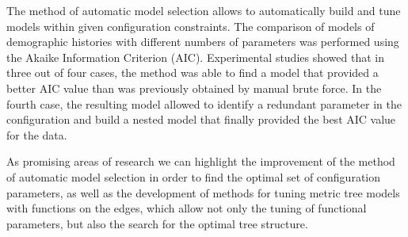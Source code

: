 The method of automatic model selection allows to automatically build and tune models within given configuration constraints.
The comparison of models of demographic histories with different numbers of parameters was performed using the Akaike Information Criterion (AIC).
Experimental studies showed that in three out of four cases, the method was able to find a model that provided a better AIC value than was previously obtained by manual brute force.
In the fourth case, the resulting model allowed to identify a redundant parameter in the configuration and build a nested model that finally provided the best AIC value for the data.

As promising areas of research we can highlight the improvement of the method of automatic model selection in order to find the optimal set of configuration parameters, as well as the development of methods for tuning metric tree models with functions on the edges, which allow not only the tuning of functional parameters, but also the search for the optimal tree structure.
